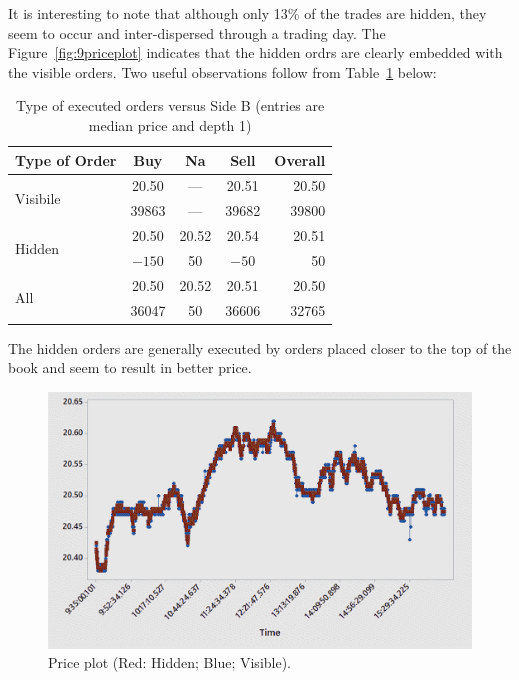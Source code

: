 It is interesting to note that although only 13\% of the trades are hidden, they seem to occur and inter-dispersed through a trading day. The Figure~\ref{fig:9priceplot} indicates that the hidden ordrs are clearly embedded with the visible orders. Two useful observations follow from Table~\ref{tab:typeexc} below:
	\begin{table}[!ht]
	\centering
	\caption{Type of executed orders versus Side B (entries are median price and depth 1) \label{tab:typeexc}}
	\begin{tabular}{l | ccc| r}
	Type of Order & Buy & Na & Sell & Overall \\ \hline
	\multirow{2}{*}{Visibile} & 20.50 & --- & 20.51 & 20.50 \\
	& 39863 & --- & 39682 & 39800 \\
	\multirow{2}{*}{Hidden} & 20.50 & 20.52 & 20.54 & 20.51 \\
	& $-150$ & 50 & $-50$ & 50 \\ \hline
	\multirow{2}{*}{All} & 20.50 & 20.52 & 20.51 & 20.50 \\
	& 36047 & 50 & 36606 & 32765
	\end{tabular}
	\end{table}
The hidden orders are generally executed by orders placed closer to the top of the book and seem to result in better price.
	\begin{figure}[!ht]
	\centering
	\includegraphics[width=1.0\textwidth]{chapters/chapter_trade_data_models/figures/priceplot.png}
	\caption{Price plot (Red: Hidden; Blue; Visible). \label{fig:priceplothidvis}}
	\end{figure}


